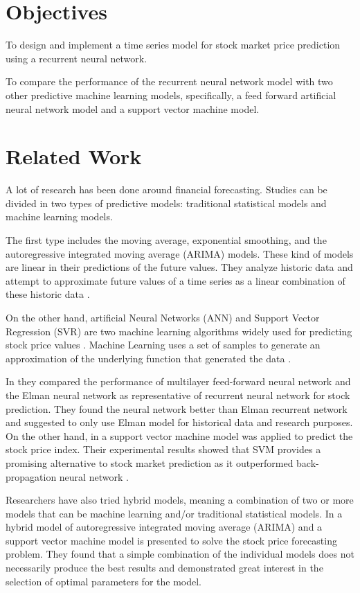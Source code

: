 \section{Objectives}
To design and implement a time series model for stock market price prediction using a recurrent neural network.

To compare the performance of the recurrent neural network model with two other predictive machine learning models, specifically, a feed forward artificial neural network model and a support vector machine model.

\section{Related Work}

A lot of research has been done around financial forecasting. Studies can be divided in two types of predictive models: traditional statistical models and machine learning models.

The first type includes the moving average, exponential smoothing, and the  autoregressive integrated moving average (ARIMA) models. These kind of models are linear in their predictions of the future values. They analyze historic data and attempt to approximate future values of a time series as a linear combination of these historic data \cite{shah2014performance}. 

On the other hand, artificial Neural Networks (ANN) and Support Vector Regression (SVR) are two machine learning algorithms widely used for predicting stock price values \cite{patel2015predicting}. Machine Learning uses a set of samples to generate an approximation of the underlying function that generated the data \cite{shah2014performance}.

In \cite{shah2014performance} they compared the performance of multilayer feed-forward neural network and the Elman neural network as representative of recurrent neural network for stock prediction. They found the neural network  better than Elman recurrent network and suggested to only use Elman model for historical data and research purposes. On the other hand, in \cite{kim2003financial} a support vector machine model was applied to predict the stock price index. Their experimental results showed that SVM provides a promising alternative to stock market prediction as it outperformed back-propagation neural network .

Researchers have also tried hybrid models, meaning a combination of two or more models that can be machine learning and/or traditional statistical models. In \cite{pai2005hybrid} a hybrid model of autoregressive integrated moving average (ARIMA) and a support vector machine model is presented to solve the stock price forecasting problem. They found that a simple combination of the individual models does not necessarily produce the best results and demonstrated great interest in the selection of optimal parameters for the model.

